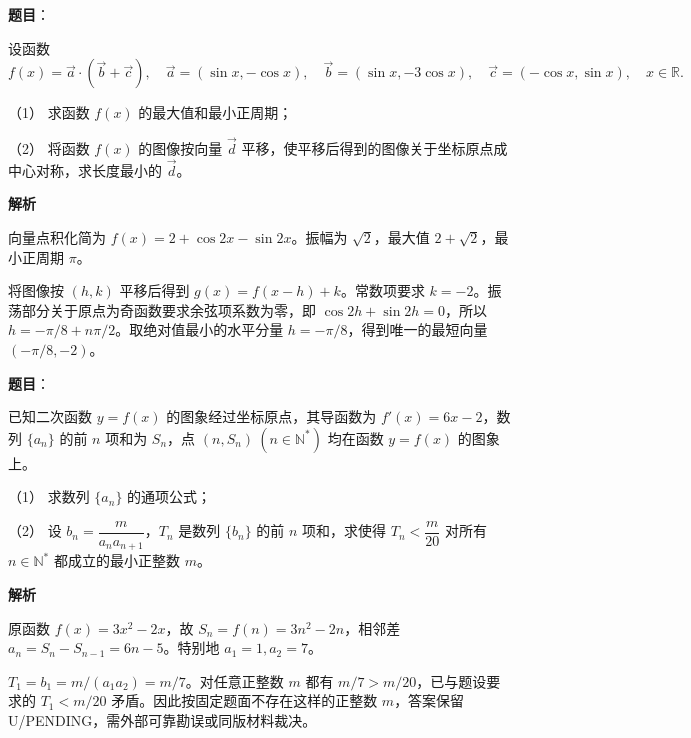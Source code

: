 \begin{answer}

\textbf{题目}：

设函数
\nopagebreak[4]
\[
f(x)=\vec a\cdot(\vec b+\vec c),\quad
\vec a=(\sin x,-\cos x),\quad
\vec b=(\sin x,-3\cos x),\quad
\vec c=(-\cos x,\sin x),\quad x\in\mathbb R.
\]

（1） 求函数 $f(x)$ 的最大值和最小正周期；

（2） 将函数 $f(x)$ 的图像按向量 $\vec d$ 平移，使平移后得到的图像关于坐标原点成中心对称，求长度最小的 $\vec d$。

\textbf{解析}


向量点积化简为 $f(x)=2+\cos2x-\sin2x$。振幅为 $\sqrt2$，最大值 $2+\sqrt2$，最小正周期 $\pi$。


将图像按 $(h,k)$ 平移后得到 $g(x)=f(x-h)+k$。常数项要求 $k=-2$。振荡部分关于原点为奇函数要求余弦项系数为零，即 $\cos2h+\sin2h=0$，所以 $h=-\pi/8+n\pi/2$。取绝对值最小的水平分量 $h=-\pi/8$，得到唯一的最短向量 $(-\pi/8,-2)$。



\end{answer}
\begin{answer}

\textbf{题目}：

已知二次函数 $y=f(x)$ 的图象经过坐标原点，其导函数为 $f'(x)=6x-2$，数列 $\{a_n\}$ 的前 $n$ 项和为 $S_n$，点 $(n,S_n)\ (n\in\mathbb N^*)$ 均在函数 $y=f(x)$ 的图象上。

（1） 求数列 $\{a_n\}$ 的通项公式；

（2） 设 $b_n=\dfrac{m}{a_na_{n+1}}$，$T_n$ 是数列 $\{b_n\}$ 的前 $n$ 项和，求使得 $T_n<\dfrac{m}{20}$ 对所有 $n\in\mathbb N^*$ 都成立的最小正整数 $m$。

\textbf{解析}


原函数 $f(x)=3x^2-2x$，故 $S_n=f(n)=3n^2-2n$，相邻差 $a_n=S_n-S_{n-1}=6n-5$。特别地 $a_1=1,a_2=7$。


$T_1=b_1=m/(a_1a_2)=m/7$。对任意正整数 $m$ 都有 $m/7>m/20$，已与题设要求的 $T_1<m/20$ 矛盾。因此按固定题面不存在这样的正整数 $m$，答案保留 U/PENDING，需外部可靠勘误或同版材料裁决。



\end{answer}
